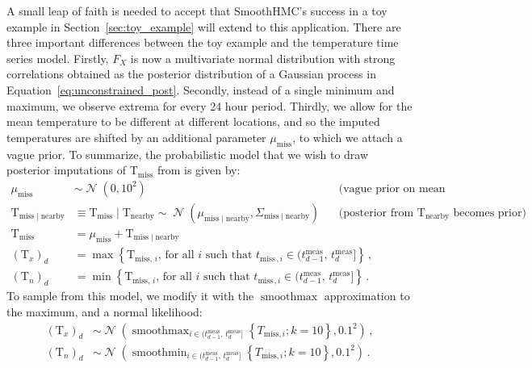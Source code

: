 \documentclass[letter]{article}
\newcommand{\genericdel}[3]{%
      \left#1#3\right#2
    }
\newcommand{\del}[1]{\genericdel(){#1}}
\newcommand{\cbr}[1]{\genericdel\{\}{#1}}
\DeclareMathOperator{\normal}{\mathcal{N}}
\newcommand{\T}{\mathrm{T}}
\newcommand{\Tn}{\T_{n}}
\newcommand{\Tx}{\T_{x}}
\newcommand{\miss}{\mathrm{miss}}
\newcommand{\obs}{\mathrm{nearby}}
\DeclareMathOperator*{\softmax}{smoothmax}
\DeclareMathOperator*{\softmin}{smoothmin}
\newcommand{\iday}{d}
\newcommand{\tmeas}{t^{\mathrm{meas}}}
\newcommand{\dayset}[1]{(\tmeas_{#1-1},\,\tmeas_{#1}]}
\newcommand{\eqlabel}[1]{\label{#1}}
\begin{document}
        A small leap of faith is needed to accept that SmoothHMC's success in a toy example in Section~\ref{sec:toy_example} will extend to this application.
There are three important differences between the toy example and the temperature time series model.
Firstly, \(F_X\) is now a multivariate normal distribution with strong correlations obtained as the posterior distribution of a Gaussian process in Equation~\eqref{eq:unconstrained_post}.
Secondly, instead of a single minimum and maximum, we observe extrema for every 24 hour period.
Thirdly, we allow for the mean temperature to be different at different locations,
and so the imputed temperatures are shifted by an additional parameter \(\mu_{\miss}\),
to which we attach a vague prior.
To summarize, the probabilistic model that we wish to draw posterior imputations of \(\T_\miss\) from is given by:
\begin{equation}
\begin{aligned}
    \mu_{\miss} &\sim \normal\del{0,10^2} & \text{ (vague prior on mean temperature)} \\
    \T_{\miss \mid \obs} &\equiv \T_{\miss} \mid \T_\obs \sim \normal\del{\mu_{\miss \mid \obs}, \Sigma_{\miss \mid \obs}} & \text{ (posterior from $\T_\obs$ becomes prior)} \\
    \T_\miss &= \mu_\miss + \T_{\miss \mid \obs} \\
    \del{\Tx}_{\iday} &= \max\cbr{\T_{\miss,\,i}\text{, for all $i$ such that } t_{\miss\,,i} \in \dayset{\iday}} \,,\\
    \del{\Tn}_{\iday} &= \min\cbr{\T_{\miss,\,i}\text{, for all $i$ such that } t_{\miss\,,i} \in \dayset{\iday}} \,.
\end{aligned}
\eqlabel{eq:idealmodel}
\end{equation}
To sample from this model, we modify it with the \(\softmax\) approximation to the maximum, and a normal likelihood:
\begin{equation}
\begin{split}
    \del{\Tx}_{\iday} &\sim \normal\del{\softmax_{i \in \dayset{\iday}} \cbr{ T_{\miss,i}; k=10}, 0.1^2}\,, \\
    \del{\Tn}_{\iday} &\sim \normal\del{\softmin_{i \in \dayset{\iday}} \cbr{ T_{\miss,i}; k=10}, 0.1^2}\,.
\end{split}
\eqlabel{eq:smoothed_model}
\end{equation}
\end{document}
